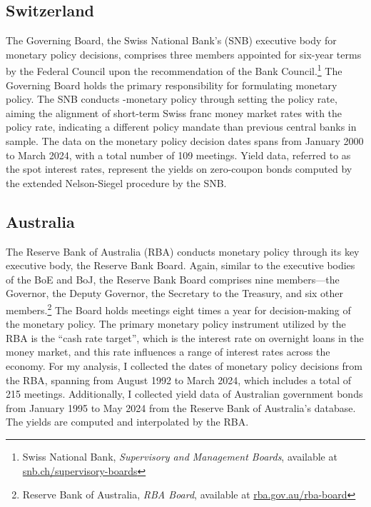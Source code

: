 \subsection{Switzerland}
The Governing Board, the Swiss National Bank's (SNB) executive body for monetary policy decisions, comprises three members appointed for six-year terms by the Federal Council upon the recommendation of the Bank Council.\footnote{Swiss National Bank, \textit{Supervisory and Management Boards}, available at \href{https://www.snb.ch/en/the-snb/organisation/supervisory-management-boards}{snb.ch/supervisory-boards}} The Governing Board holds the primary responsibility for formulating monetary policy. The SNB conducts -monetary policy through setting the policy rate, aiming the alignment of short-term Swiss franc money market rates with the policy rate, indicating a different policy mandate than previous central banks in sample. The data on the monetary policy decision dates spans from January 2000 to March 2024, with a total number of 109 meetings. Yield data, referred to as the spot interest rates, represent the yields on zero-coupon bonds computed by the extended Nelson-Siegel procedure by the SNB.

\subsection{Australia}

The Reserve Bank of Australia (RBA) conducts monetary policy through its key executive body, the Reserve Bank Board. Again, similar to the executive bodies of the BoE and BoJ, the Reserve Bank Board comprises nine members---the Governor, the Deputy Governor, the Secretary to the Treasury, and six other members.\footnote{Reserve Bank of Australia, \textit{RBA Board}, available at \href{https://www.rba.gov.au/about-rba/boards/rba-board.html}{rba.gov.au/rba-board}} The Board holds meetings eight times a year for decision-making of the monetary policy. The primary monetary policy instrument utilized by the RBA is the ``cash rate target'', which is the interest rate on overnight loans in the money market, and this rate influences a range of interest rates across the economy. For my analysis, I collected the dates of monetary policy decisions from the RBA, spanning from August 1992 to March 2024, which includes a total of 215 meetings. Additionally, I collected yield data of Australian government bonds from January 1995 to May 2024 from the Reserve Bank of Australia's database. The yields are computed and interpolated by the RBA.
